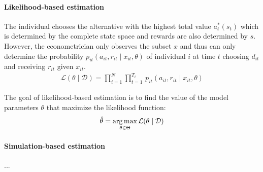 \paragraph{Likelihood-based estimation} The individual chooses the alternative with the highest total value $a_t^*(s_t)$ which is determined by the complete state space and rewards are also determined by $s$. However, the econometrician only observes the subset $x$ and thus can only determine the probability $p_{it}(a_{it}, r_{it} \mid x_{it}, \theta)$ of individual $i$ at time $t$ choosing $d_{it}$ and receiving $r_{it}$ given $x_{it}$.
%
\begin{align*}
  \mathcal{L}(\theta\mid\mathcal{D}) = \prod^N_{i= 1} \prod^{T_i}_{t= 1}\, p_{it}(a_{it}, r_{it} \mid x_{it}, \theta)
\end{align*}

The goal of likelihood-based estimation is to find the value of the model parameters $\theta$ that maximize the likelihood function:
%
\begin{align*}
\hat{\theta} = \operatorname*{arg\,max}_{\theta \in \Theta} \mathcal{L}(\theta\mid\mathcal{D})
\end{align*}

\paragraph{Simulation-based estimation} ...
